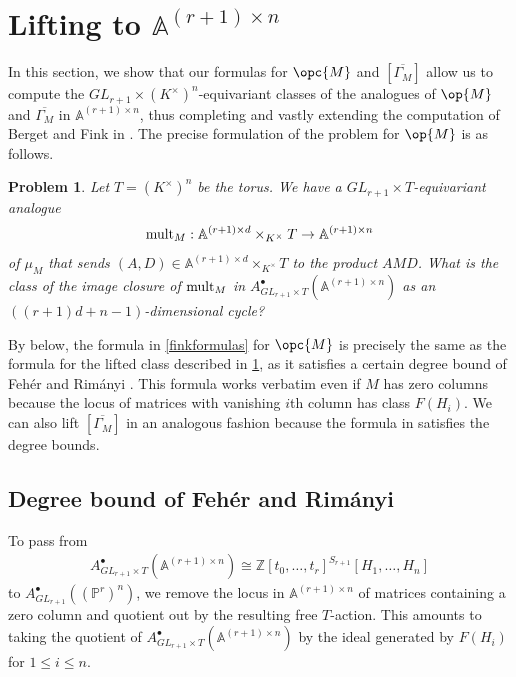 \documentclass[12pt]{amsart}
\newcommand{\mb}{\mathbb}
\newcommand{\ol}{\overline}
\theoremstyle{plain}
\newtheorem{Pro}[Thm]{Problem}
\theoremstyle{definition}
\theoremstyle{remark}
\begin{document}
\section{Lifting to $\mb{A}^{(r+1)\times n}$}\label{liftingsection}

In this section, we show that our formulas for $\opc{M}$ and $[\ol{\Gamma_M}]$ allow us to compute the $GL_{r+1}\times (K^\times)^n$-equivariant classes of the analogues of $\op{M}$ and $\ol{\Gamma_M}$ in $\mb{A}^{(r+1)\times n}$, thus completing and vastly extending the computation of Berget and Fink in \cite{Fink}. The precise formulation of the problem for $\op{M}$ is as follows.
\begin{Pro}
\label{AV}
Let $T = (K^\times)^n$ be the torus. We have a $GL_{r+1} \times T$-equivariant analogue
\begin{align*}
{\rm mult}_M:\mb{A}^{(r+1)\times d} \times_{K^\times} T \rightarrow \mb{A}^{(r+1)\times n}
\end{align*}
of $\mu_M$ that sends $(A,D) \in \mb{A}^{(r+1)\times d}\times_{K^{\times}} T$ to the product $AMD$. What is the class of the image closure of ${\rm mult}_M$ in $A^{\bullet}_{GL_{r+1} \times T}(\mb{A}^{(r+1)\times n})$ as an $((r+1)d+n-1)$-dimensional cycle?
\end{Pro}

By  below, the formula in \cref{finkformulas} for $\opc{M}$ is precisely the same as the formula for the lifted class described in \cref{AV}, as it satisfies a certain degree bound of Feh\'er and Rim\'anyi \cite{FR07}. This formula works verbatim even if $M$ has zero columns because the locus of matrices with vanishing $i$th column has class $F(H_i)$. We can also lift $[\ol{\Gamma_M}]$ in an analogous fashion because the formula in  satisfies the degree bounds.



\subsection{Degree bound of Feh\'er and Rim\'anyi}
To pass from 
\begin{align*}
A^{\bullet}_{GL_{r+1}\times T}(\mb{A}^{(r+1)\times n})\cong \mb{Z}[t_0,\ldots,t_r]^{S_{r+1}}[H_1,\ldots,H_n]
\end{align*}
to $A^{\bullet}_{GL_{r+1}}((\mb{P}^r)^n)$, we remove the locus in $\mb{A}^{(r+1)\times n}$ of matrices containing a zero column and quotient out by the resulting free $T$-action. This amounts to taking the quotient of $A^{\bullet}_{GL_{r+1}\times T}(\mb{A}^{(r+1)\times n})$ by the ideal generated by $F(H_i)$ for $1\leq i\leq n$.
\end{document}
